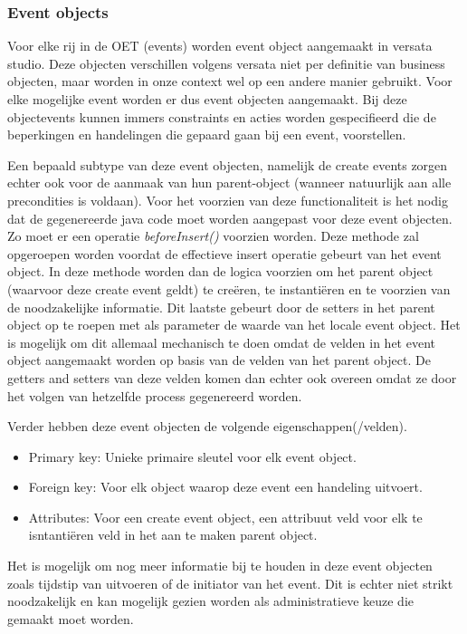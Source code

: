 \subsubsection{Event objects}
Voor elke rij in de OET (events) worden event object aangemaakt in versata studio. Deze objecten verschillen volgens versata niet per definitie van business objecten, maar worden in onze context wel op een andere manier gebruikt. Voor elke mogelijke event worden er dus event objecten aangemaakt. 
Bij deze objectevents kunnen immers constraints en acties worden gespecifieerd die de beperkingen en handelingen die gepaard gaan bij een event, voorstellen.

Een bepaald subtype van deze event objecten, namelijk de create events zorgen echter ook voor de aanmaak van hun parent-object (wanneer natuurlijk aan alle precondities is voldaan).
Voor het voorzien van deze functionaliteit is het nodig dat de gegenereerde java code moet worden aangepast voor deze event objecten. Zo moet er een operatie \textit{beforeInsert()} voorzien worden. 
Deze methode zal opgeroepen worden voordat de effectieve insert operatie gebeurt van het event object. In deze methode worden dan de logica voorzien om het parent object (waarvoor deze create event geldt) te cre\"eren, te instanti\"eren en te voorzien van de noodzakelijke informatie. 
Dit laatste gebeurt door de setters in het parent object op te roepen met als parameter de waarde van het locale event object.
Het is mogelijk om dit allemaal mechanisch te doen omdat de velden in het event object aangemaakt worden op basis van de velden van het parent object. 
De getters and setters van deze velden komen dan echter ook overeen omdat ze door het volgen van hetzelfde process gegenereerd worden.
 

Verder hebben deze event objecten de volgende eigenschappen(/velden).
\begin{itemize}
	\item Primary key: Unieke primaire sleutel voor elk event object.
	\item Foreign key: Voor elk object waarop deze event een handeling uitvoert.
	\item Attributes: Voor een create event object, een attribuut veld voor elk te isntanti\"eren veld in het aan te maken parent object.
\end{itemize}

Het is mogelijk om nog meer informatie bij te houden in deze event objecten zoals tijdstip van uitvoeren of de initiator van het event. Dit is echter niet strikt noodzakelijk en kan mogelijk gezien worden als administratieve keuze die gemaakt moet worden.
